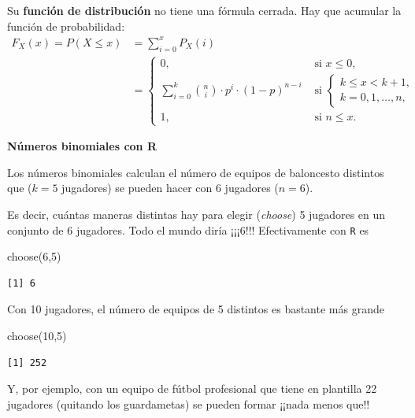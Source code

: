 \documentclass[
  letterpaper,
  DIV=11,
  numbers=noendperiod]{scrreprt}
\newenvironment{Shaded}{\begin{snugshade}}{\end{snugshade}}
\newcommand{\DecValTok}[1]{\textcolor[rgb]{0.68,0.00,0.00}{#1}}
\newcommand{\FunctionTok}[1]{\textcolor[rgb]{0.28,0.35,0.67}{#1}}
\newcommand{\NormalTok}[1]{\textcolor[rgb]{0.00,0.23,0.31}{#1}}
\begin{document}
Su \textbf{función de distribución} no tiene una fórmula cerrada. Hay
que acumular la función de probabilidad: \[
\begin{array}{ll}
F_{X}(x)=P(X\leq x) & =  \sum_{i=0}^x P_X(i)\\
& = 
\left\{
\begin{array}{ll}
0, & \mbox{ si } x\leq 0,\\\displaystyle
\sum_{i=0}^k {n\choose i}\cdot  p^i \cdot (1-p)^{n-i} & \mbox{ si } 
\left\{
  \begin{array}{l} 
  k\leq x< k+1,\\
  k=0,1,\ldots,n,
  \end{array}
\right.\\
1, & \mbox{ si } n\leq x.
\end{array}
\right.
\end{array}
\]

\textbf{Números binomiales con R}

Los números binomiales calculan el número de equipos de baloncesto
distintos que (\(k=5\) jugadores) se pueden hacer con 6 jugadores
(\(n=6\)).

Es decir, cuántas maneras distintas hay para elegir (\emph{choose}) 5
jugadores en un conjunto de 6 jugadores. Todo el mundo diría ¡¡¡6!!!
Efectivamente con \texttt{R} es

\begin{Shaded}
\begin{Highlighting}[]
\FunctionTok{choose}\NormalTok{(}\DecValTok{6}\NormalTok{,}\DecValTok{5}\NormalTok{)}
\end{Highlighting}
\end{Shaded}

\begin{verbatim}
[1] 6
\end{verbatim}

Con 10 jugadores, el número de equipos de 5 distintos es bastante más
grande

\begin{Shaded}
\begin{Highlighting}[]
\FunctionTok{choose}\NormalTok{(}\DecValTok{10}\NormalTok{,}\DecValTok{5}\NormalTok{)}
\end{Highlighting}
\end{Shaded}

\begin{verbatim}
[1] 252
\end{verbatim}

Y, por ejemplo, con un equipo de fútbol profesional que tiene en
plantilla 22 jugadores (quitando los guardametas) se pueden formar
¡¡nada menos que!!
\end{document}

